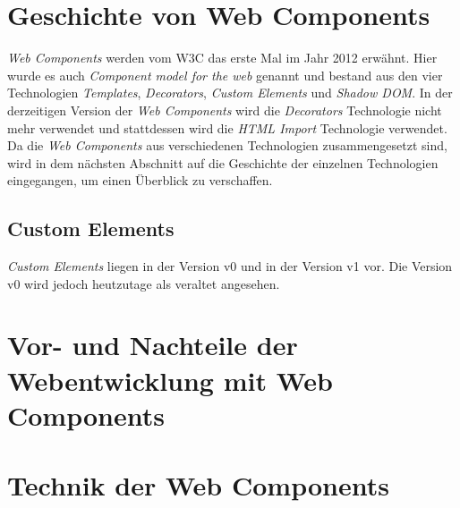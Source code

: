 \documentclass[12pt, paper=a4, bibtotoc, toc=listof]{scrreprt}
\begin{document}
		\section{Geschichte von Web Components}
		\emph{Web Components} werden vom \ac{W3C} das erste Mal im Jahr 2012 erwähnt. Hier wurde es auch \emph{Component model for the web} genannt und bestand aus den vier Technologien \emph{Templates}, \emph{Decorators}, \emph{Custom Elements} und \emph{Shadow DOM}. In der derzeitigen Version der \emph{Web Components} wird die \emph{Decorators} Technologie nicht mehr verwendet und stattdessen wird die \emph{\ac{HTML} Import} Technologie verwendet. Da die \emph{Web Components} aus verschiedenen Technologien zusammengesetzt sind, wird in dem nächsten Abschnitt auf die Geschichte der einzelnen Technologien eingegangen, um einen Überblick zu verschaffen.
		\subsection{Custom Elements}
		\emph{Custom Elements} liegen in der Version v0 und in der Version v1 vor. Die Version v0 wird jedoch heutzutage als veraltet angesehen.
		\section{Vor- und Nachteile der Webentwicklung mit Web Components}
		\section{Technik der Web Components}
\end{document}
